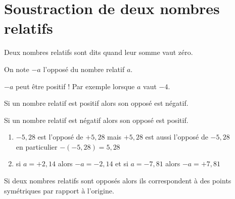 \section{Soustraction de deux nombres relatifs}
\begin{definition}
    Deux nombres relatifs sont dits  quand leur somme vaut zéro.
\end{definition}

\begin{notation}
    On note $-a$ l'opposé du nombre relatif $a$.
\end{notation}

\begin{remarque}
    $-a$ peut être positif ! Par exemple lorsque $a$ vaut $-4$.
\end{remarque}

\begin{propriete}[(admise)]
    Si un nombre relatif est positif alors son opposé est négatif.
\end{propriete}

\begin{propriete}[(admise)]
    Si un nombre relatif est négatif alors son opposé est positif.
\end{propriete}

\begin{exemple*1}
    \begin{enumerate}
        \item $-5,28$ est l'opposé de $+5,28$ mais $+5,28$ est aussi l'opposé de $-5,28$ \\en particulier $-(-5,28)=5,28$
        \item si $a=+2,14$ alors $-a=-2,14$ et si $a=-7,81$ alors $-a=+7,81$
    \end{enumerate}
\end{exemple*1}

\begin{propriete}
    Si deux nombres relatifs sont opposés alors ils correspondent à des points symétriques par rapport à l'origine.
\end{propriete}


